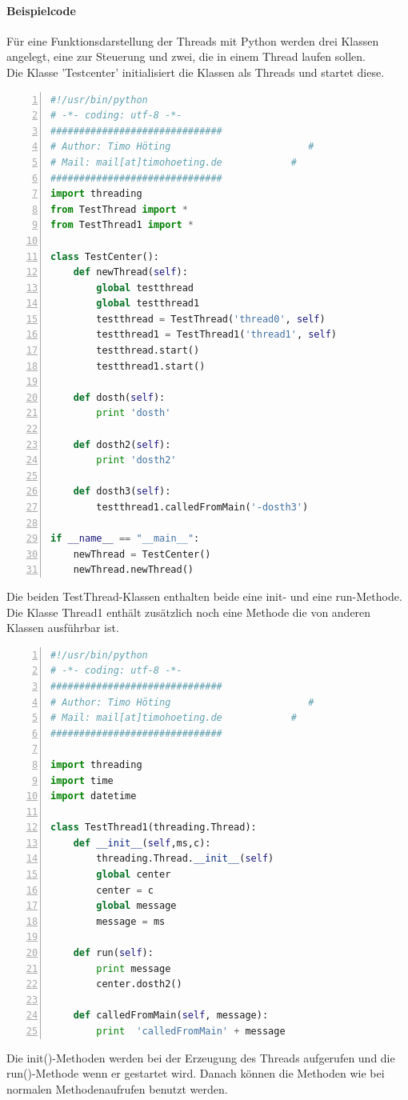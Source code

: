 \paragraph{Beispielcode}
Für eine Funktionsdarstellung der Threads mit Python werden drei Klassen angelegt, eine zur Steuerung und zwei, die in einem Thread laufen sollen. \\
Die Klasse 'Testcenter' initialisiert die Klassen als Threads und startet diese.
\begin{lstlisting}[caption=Klasse Testcenter, language=python, frame=single, breaklines=true,columns=fullflexible, commentstyle=\color{gray}\upshape, captionpos=b, numbers = left]
#!/usr/bin/python
# -*- coding: utf-8 -*-
##############################
# Author: Timo Höting                        #
# Mail: mail[at]timohoeting.de            #
##############################
import threading
from TestThread import *
from TestThread1 import *

class TestCenter():
    def newThread(self):
        global testthread
        global testthread1
        testthread = TestThread('thread0', self)
        testthread1 = TestThread1('thread1', self)
        testthread.start()
        testthread1.start()

    def dosth(self):
        print 'dosth'

    def dosth2(self):
        print 'dosth2'

    def dosth3(self):
        testthread1.calledFromMain('-dosth3')

if __name__ == "__main__":
    newThread = TestCenter()
    newThread.newThread()
\end{lstlisting}
Die beiden TestThread-Klassen enthalten beide eine init- und eine run-Methode. Die Klasse Thread1 enthält zusätzlich noch eine Methode die von anderen Klassen ausführbar ist. 
\begin{lstlisting}[caption=Klasse TestThread1, language=python, frame=single, breaklines=true,columns=fullflexible, commentstyle=\color{gray}\upshape, captionpos=b, numbers = left]
#!/usr/bin/python
# -*- coding: utf-8 -*-
##############################
# Author: Timo Höting                        #
# Mail: mail[at]timohoeting.de            #
##############################

import threading
import time
import datetime

class TestThread1(threading.Thread):
    def __init__(self,ms,c):
        threading.Thread.__init__(self)
        global center
        center = c
        global message
        message = ms

    def run(self):
        print message
        center.dosth2()

    def calledFromMain(self, message):
        print  'calledFromMain' + message
\end{lstlisting}
Die init()-Methoden werden bei der Erzeugung des Threads aufgerufen und die run()-Methode wenn er gestartet wird. Danach können die Methoden wie bei normalen Methodenaufrufen benutzt werden. 


